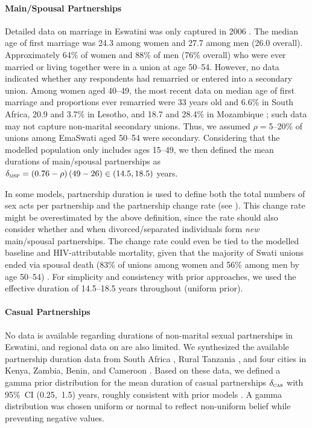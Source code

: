 \paragraph{Main/Spousal Partnerships}
Detailed data on marriage in Eswatini was only captured in 2006 \cite[Table~6.1]{SDHS2006}.
The median age of first marriage was 24.3 among women and 27.7 among men (26.0 overall).
Approximately 64\% of women and 88\% of men (76\% overall) who were ever married or living together
were in a union at age 50--54.
However, no data indicated whether any respondents had remarried or entered into a secondary union.
Among women aged 40--49, the most recent data on
median age of first marriage and proportions ever remarried were
33 years old and 6.6\% in South Africa,
20.9 and 3.7\% in Lesotho, and 18.7 and 28.4\% in Mozambique \cite{John2022};
such data may not capture non-marital secondary unions.
Thus, we assumed $\rho = {}$5--20\% of unions among EmaSwati aged 50--54 were secondary.
Considering that the modelled population only includes ages 15--49,
we then defined the mean durations of main/spousal partnerships as
$\delta_{\textsc{msp}} =  (0.76 - \rho)\,(49 - 26) \in (14.5, 18.5)$ years.
\par
In some models, partnership duration is used to define both
the total numbers of sex acts per partnership and the partnership change rate (see ).
This change rate might be overestimated by the above definition,
since the rate should also consider whether and when
divorced/separated individuals form \emph{new} main/spousal partnerships.
The change rate could even be tied to the modelled baseline and HIV-attributable mortality,
given that the majority of Swati unions ended via spousal death
(83\% of unions among women and 56\% among men by age 50--54) \cite{SDHS2006}.
For simplicity and consistency with prior approaches,
we used the effective duration of 14.5--18.5 years throughout (uniform prior).
\paragraph{Casual Partnerships}
No data is available regarding durations of non-marital sexual partnerships in Eswatini,
and regional data on are also limited.
We synthesized the available partnership duration data from
South Africa \cite{Harrison2008,Hargreaves2009,Nguyen2015},
Rural Tanzania \cite{Nnko2004},
and four cities in Kenya, Zambia, Benin, and Cameroon \cite{Ferry2001}.
Based on these data, we defined a gamma prior distribution for
the mean duration of casual partnerships $\delta_{\textsc{cas}}$ with 95\%~CI (0.25,~1.5) years,
roughly consistent with prior models \cite{Johnson2009}.
A gamma distribution was chosen \vs uniform or normal
to reflect non-uniform belief while preventing negative values.
